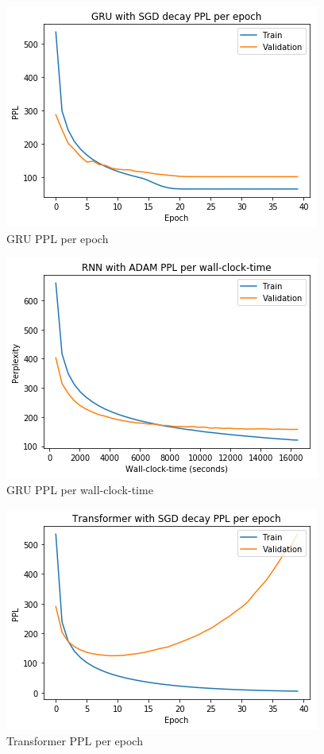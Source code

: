 \begin{figure}[H]
	\centering
	\includegraphics[scale=0.8]{Q4-1_GRU_SGDLR_epoch.png}
	\caption{GRU PPL per epoch}
	\label{fig:fig3}
\end{figure}

\begin{figure}[H]
	\centering
	\includegraphics[scale=0.8]{Q4-1_RNN_ADAM_clock.png}
	\caption{GRU PPL per wall-clock-time}
	\label{fig:fig4}
\end{figure}

\begin{figure}[H]
	\centering
	\includegraphics[scale=0.8]{Q4-1_TR_SGDLR_epoch.png}
	\caption{Transformer PPL per epoch}
	\label{fig:fig5}
\end{figure}

